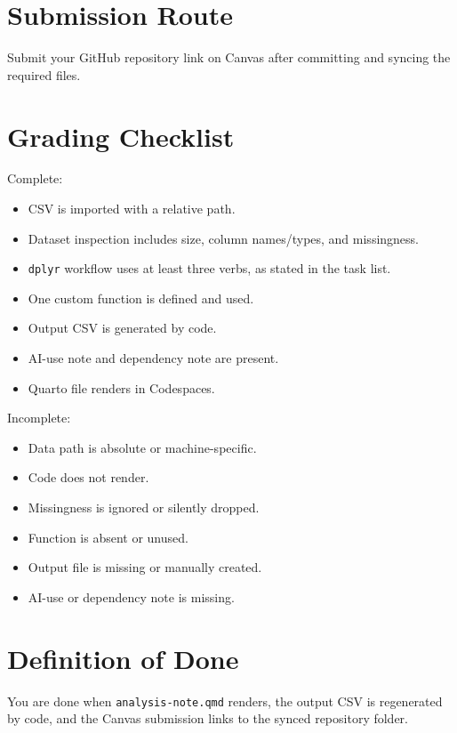 \documentclass[
  letterpaper,
  DIV=11,
  numbers=noendperiod,
  oneside]{scrreprt}
\providecommand{\tightlist}{%
  \setlength{\itemsep}{0pt}\setlength{\parskip}{0pt}}
\begin{document}
\section{Submission Route}\label{submission-route-1}

Submit your GitHub repository link on Canvas after committing and
syncing the required files.

\section{Grading Checklist}\label{grading-checklist-1}

Complete:

\begin{itemize}
\tightlist
\item
  CSV is imported with a relative path.
\item
  Dataset inspection includes size, column names/types, and missingness.
\item
  \texttt{dplyr} workflow uses at least three verbs, as stated in the
  task list.
\item
  One custom function is defined and used.
\item
  Output CSV is generated by code.
\item
  AI-use note and dependency note are present.
\item
  Quarto file renders in Codespaces.
\end{itemize}

Incomplete:

\begin{itemize}
\tightlist
\item
  Data path is absolute or machine-specific.
\item
  Code does not render.
\item
  Missingness is ignored or silently dropped.
\item
  Function is absent or unused.
\item
  Output file is missing or manually created.
\item
  AI-use or dependency note is missing.
\end{itemize}

\section{Definition of Done}\label{definition-of-done-11}

You are done when \texttt{analysis-note.qmd} renders, the output CSV is
regenerated by code, and the Canvas submission links to the synced
repository folder.
\end{document}
